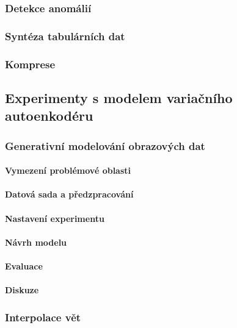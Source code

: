 \documentclass[11pt,a4paper]{report}
\begin{document}
\section{Detekce anomálií}
\section{Syntéza tabulárních dat}
\section{Komprese}


\chapter{Experimenty s modelem variačního autoenkodéru}
\section{Generativní modelování obrazových dat}
\subsection{Vymezení problémové oblasti}
\subsection{Datová sada a předzpracování}
\subsection{Nastavení experimentu}
\subsection{Návrh modelu}
\subsection{Evaluace}
\subsection{Diskuze}
\section{Interpolace vět}

{%
\pagestyle{plain}

}




\part*{\Prilohy\thispagestyle{empty}}
\appendix

% 
% 
\end{document}
